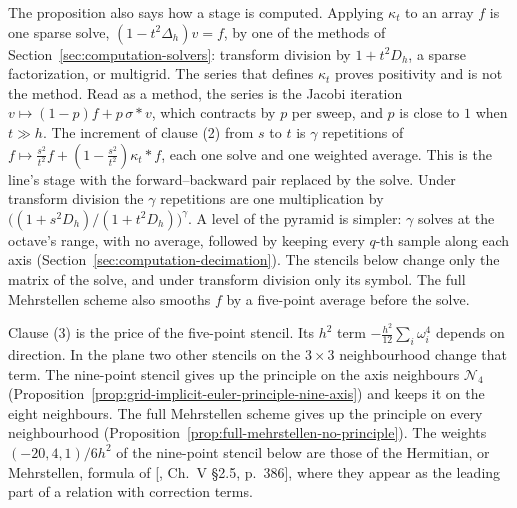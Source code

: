 The proposition also says how a stage is computed. Applying $\kappa_t$ to an array $f$ is one sparse
solve, $(1 - t^2\Delta_h)v = f$, by one of the methods of Section~\ref{sec:computation-solvers}:
transform division by $1 + t^2D_h$, a sparse factorization, or multigrid. The series that defines
$\kappa_t$ proves positivity and is not the method. Read as a method, the series is the Jacobi
iteration
$v \mapsto (1-p)f + p\,\sigma * v$, which contracts by $p$ per sweep, and $p$ is close to $1$ when
$t \gg h$. The increment of clause (2) from $s$ to $t$ is $\gamma$ repetitions of
$f \mapsto \tfrac{s^2}{t^2}f + (1 - \tfrac{s^2}{t^2})\kappa_t * f$, each one solve and one weighted
average. This is the line's stage with the forward--backward pair replaced by the solve. Under
transform division the $\gamma$ repetitions are one multiplication by
$\bigl((1 + s^2D_h)/(1 + t^2D_h)\bigr)^\gamma$. A level of the pyramid is simpler: $\gamma$ solves at
the octave's range, with no average, followed by keeping every $q$-th sample along each axis
(Section~\ref{sec:computation-decimation}). The stencils below change only the matrix of the solve, and under transform division only
its symbol. The full Mehrstellen scheme also smooths $f$ by a five-point average before the solve.

Clause (3) is the price of the five-point stencil. Its $h^2$ term $-\tfrac{h^2}{12}\sum_i\omega_i^4$
depends on direction. In the plane two other stencils on the $3 \times 3$ neighbourhood change that
term. The nine-point stencil gives up the principle on the axis neighbours $\mathcal{N}_4$
(Proposition~\ref{prop:grid-implicit-euler-principle-nine-axis}) and keeps it on the eight
neighbours. The full Mehrstellen scheme gives up the principle on every neighbourhood
(Proposition~\ref{prop:full-mehrstellen-no-principle}). The weights
$(-20, 4, 1)/6h^2$ of the nine-point stencil below are those of the Hermitian, or Mehrstellen,
formula of [, Ch.~V \S 2.5, p.~386], where they appear as the leading part
of a relation with correction terms.

